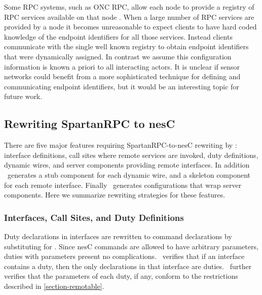 Some RPC systems, such as ONC RPC, allow each node to provide a registry
of RPC services available on that node \cite{RFC-1833}. When a large
number of RPC services are provided by a node it becomes unreasonable to
expect clients to have hard coded knowledge of the endpoint identifiers
for all those services. Instead clients communicate with the single well
known registry to obtain endpoint identifiers that were dynamically
assigned. In contrast we assume this configuration information is known
a priori to all interacting actors. It is unclear if sensor networks
could benefit from a more sophisticated technique for defining and
communicating endpoint identifiers, but it would be an interesting topic
for future work.

\subsection{Rewriting SpartanRPC to nesC}

There are five major features requiring SpartanRPC-to-nesC rewriting by
\Sprocket: interface definitions, call sites where remote services are
invoked, duty definitions, dynamic wires, and server components
providing remote interfaces. In addition \Sprocket\ generates a stub
component for each dynamic wire, and a skeleton component for each
remote interface. Finally \Sprocket\ generates configurations that wrap
server components. Here we summarize rewriting strategies for these
features.


\subsubsection{Interfaces, Call Sites, and Duty Definitions}

Duty declarations in interfaces are rewritten to command declarations by
substituting  for . Since nesC commands are
allowed to have arbitrary parameters, duties with parameters present no
complications. \Sprocket\ verifies that if an interface contains a duty,
then the only declarations in that interface are duties. \Sprocket\
further verifies that the parameters of each duty, if any, conform to
the restrictions described in \autoref{section-remotable}.

